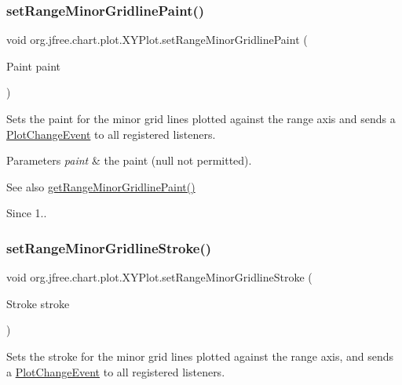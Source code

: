 \subsubsection{\texorpdfstring{set\+Range\+Minor\+Gridline\+Paint()}{setRangeMinorGridlinePaint()}}
{\footnotesize\ttfamily void org.\+jfree.\+chart.\+plot.\+X\+Y\+Plot.\+set\+Range\+Minor\+Gridline\+Paint (\begin{DoxyParamCaption}\item[{Paint}]{paint }\end{DoxyParamCaption})}

Sets the paint for the minor grid lines plotted against the range axis and sends a \mbox{\hyperlink{}{Plot\+Change\+Event}} to all registered listeners.


\begin{DoxyParams}{Parameters}
{\em paint} & the paint ({\ttfamily null} not permitted).\\
\hline
\end{DoxyParams}
\begin{DoxySeeAlso}{See also}
\mbox{\hyperlink{classorg_1_1jfree_1_1chart_1_1plot_1_1_x_y_plot_a159858bb023850b61558031e98e7c2d4}{get\+Range\+Minor\+Gridline\+Paint()}}
\end{DoxySeeAlso}
\begin{DoxySince}{Since}
1.. 
\end{DoxySince}
\mbox{\label{classorg_1_1jfree_1_1chart_1_1plot_1_1_x_y_plot_ad75d87153b88ec024020f24ee1c683ef}} 
\subsubsection{\texorpdfstring{set\+Range\+Minor\+Gridline\+Stroke()}{setRangeMinorGridlineStroke()}}
{\footnotesize\ttfamily void org.\+jfree.\+chart.\+plot.\+X\+Y\+Plot.\+set\+Range\+Minor\+Gridline\+Stroke (\begin{DoxyParamCaption}\item[{Stroke}]{stroke }\end{DoxyParamCaption})}

Sets the stroke for the minor grid lines plotted against the range axis, and sends a \mbox{\hyperlink{}{Plot\+Change\+Event}} to all registered listeners.



